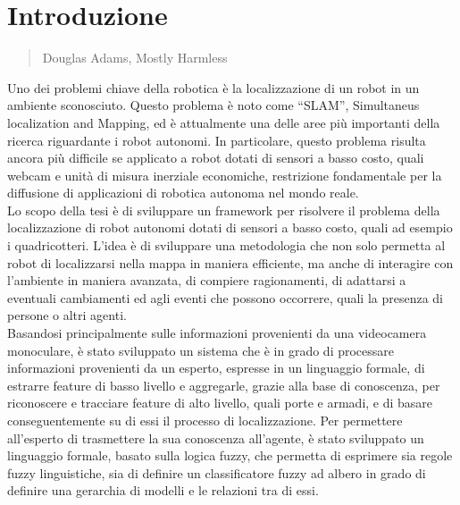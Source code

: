 \chapter{Introduzione}
\label{Introduzione}
\thispagestyle{empty}

\begin{quotation}
{\footnotesize
{}
\begin{flushright}
Douglas Adams, Mostly Harmless
\end{flushright}
}
\end{quotation}
\vspace{0.5cm}

Uno dei problemi chiave della robotica è la localizzazione di un robot in un ambiente sconosciuto. Questo problema è noto come ``SLAM'', Simultaneus localization and Mapping, ed è attualmente una delle aree più importanti della ricerca riguardante i robot autonomi. 
In particolare, questo problema risulta ancora più difficile se applicato a robot dotati di sensori a basso costo, quali webcam e unità di misura inerziale economiche, restrizione fondamentale per la diffusione di applicazioni di robotica autonoma nel mondo reale. \\
Lo scopo della tesi è di sviluppare un framework per risolvere il problema della localizzazione di robot autonomi dotati di sensori a basso costo, quali ad esempio i quadricotteri. L'idea è di sviluppare una metodologia che non solo permetta al robot di localizzarsi nella mappa in maniera efficiente, ma anche di interagire con l'ambiente in maniera avanzata, di compiere ragionamenti, di adattarsi a eventuali cambiamenti ed agli eventi che possono occorrere, quali la presenza di persone o altri agenti. \\
Basandosi principalmente sulle informazioni provenienti da una videocamera monoculare, è stato sviluppato un sistema che è in grado di processare informazioni provenienti da un esperto, espresse in un linguaggio formale, di estrarre feature di basso livello e aggregarle, grazie alla base di conoscenza, per riconoscere e tracciare feature di alto livello, quali porte e armadi, e di basare conseguentemente su di essi il processo di localizzazione.
Per permettere all'esperto di trasmettere la sua conoscenza all'agente, è stato sviluppato un linguaggio formale, basato sulla logica fuzzy, che permetta di esprimere sia regole fuzzy linguistiche, sia di definire un classificatore fuzzy ad albero in grado di definire una gerarchia di modelli e le relazioni tra di essi. \\



